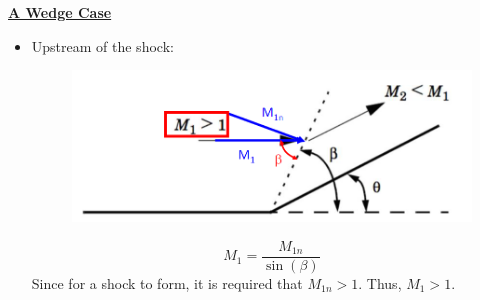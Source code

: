 \textbf{{\color{blue}\underline{A Wedge Case}}}
\begin{itemize}
    \item {\color{red}Upstream of the shock:}
    \begin{figure}[H]
        \centering
        \includegraphics[width=1.0\linewidth]{images/oblique_shocks_upstream.png}
    \end{figure}
    \begin{equation*}
        M_1 = \frac{M_{1n}}{\sin(\beta)}
    \end{equation*}
    Since for a shock to form, it is required that $M_{1n}>1$. Thus, {\color{blue}$M_1 > 1$}. 
    

\end{itemize}
